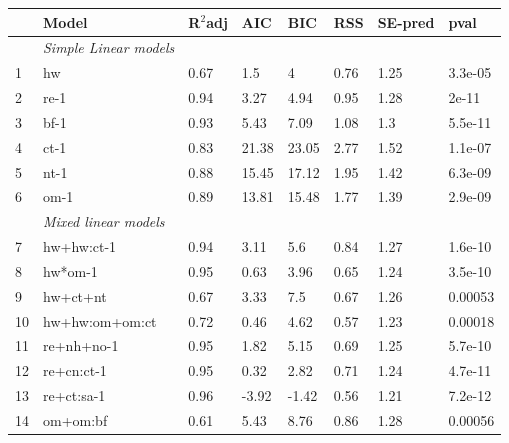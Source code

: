 \documentclass[10pt,twoside,dutch,english]{report}
\begin{document}
\begin{appendices}
\begin{table}[hb]
		\begin{tabu} to \textwidth{X[1,l]X[3,l]X[1,r]X[1,r]X[1,r]X[1,r]X[1,r]X[1,r]}
			\toprule \rowfont{\bfseries}
 & Model & R$^2$adj & AIC & BIC & RSS & SE-pred & pval \\ 
 \midrule
&\textit{Simple Linear models}& & & & & & \\
1 & hw & 0.67 & 1.5 & 4 & 0.76 & 1.25 & 3.3e-05 \\ 
2 & re-1 & 0.94 & 3.27 & 4.94 & 0.95 & 1.28 & 2e-11 \\ 
3 & bf-1 & 0.93 & 5.43 & 7.09 & 1.08 & 1.3 & 5.5e-11 \\ 
4 & ct-1 & 0.83 & 21.38 & 23.05 & 2.77 & 1.52 & 1.1e-07 \\ 
5 & nt-1 & 0.88 & 15.45 & 17.12 & 1.95 & 1.42 & 6.3e-09 \\ 
6 & om-1 & 0.89 & 13.81 & 15.48 & 1.77 & 1.39 & 2.9e-09 \\   \addlinespace[0.5cm]
&\textit{Mixed linear models}& & & & & & \\
 7 & hw+hw:ct-1 & 0.94 & 3.11 & 5.6 & 0.84 & 1.27 & 1.6e-10 \\ 
 8 & hw*om-1 & 0.95 & 0.63 & 3.96 & 0.65 & 1.24 & 3.5e-10 \\ 
 9 & hw+ct+nt & 0.67 & 3.33 & 7.5 & 0.67 & 1.26 & 0.00053 \\ 
 10 & hw+hw:om+om:ct & 0.72 & 0.46 & 4.62 & 0.57 & 1.23 & 0.00018 \\ 
 11 & re+nh+no-1 & 0.95 & 1.82 & 5.15 & 0.69 & 1.25 & 5.7e-10 \\ 
 12 & re+cn:ct-1 & 0.95 & 0.32 & 2.82 & 0.71 & 1.24 & 4.7e-11 \\ 
 13 & re+ct:sa-1 & 0.96 & -3.92 & -1.42 & 0.56 & 1.21 & 7.2e-12 \\ 
 14 & om+om:bf & 0.61 & 5.43 & 8.76 & 0.86 & 1.28 & 0.00056 \\
\bottomrule
			
		\end{tabu}
		\label{tab: results_mods}
	\end{table}
    
  

\end{appendices}
\end{document}
